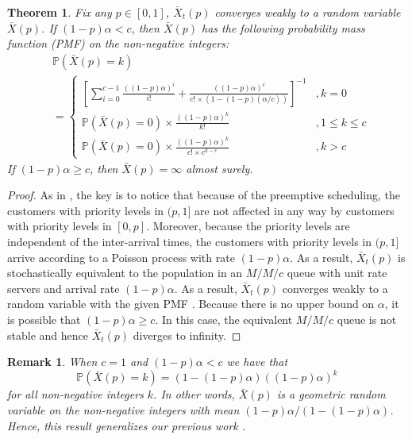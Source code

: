 \documentclass[conference]{IEEEtran}
\newtheorem{theorem}{Theorem}
\newtheorem{remark}{Remark}
\renewcommand{\P}{\mathbb{P}}
\begin{document}
\begin{theorem}
  \label{thrm:X_bar}
  Fix any $p \in [0, 1]$, $\bar X_t(p)$ converges weakly to a random
  variable $\bar X(p)$. If $(1-p)\alpha < c$, then $\bar X(p)$ has the
  following probability mass function (PMF) on the non-negative
  integers:
  \begin{align}
    &\P(\bar X(p) = k)\\
    &= \left\{
      \begin{array}{ll}
        \left[\sum_{i=0}^{c -1} \frac{((1-p)\alpha)^i}{i!} + \frac{((1-p)\alpha)^c}{c! \times (1 - (1-p)(\alpha/c))}\right]^{-1}&, k = 0\\
        \P(\bar X(p) = 0) \times  \frac{((1-p)\alpha)^k}{k!}&, 1 \leq k \leq c\\
        \P(\bar X(p) = 0) \times \frac{((1-p)\alpha)^k}{c! \times c^{k - c}} &, k > c
      \end{array}
    \right.\nonumber
  \end{align}
  If $(1-p)\alpha \geq c$, then $\bar X(p) = \infty$ almost surely.
\end{theorem}
\begin{proof}
  As in \cite{Master_ACC_2017}, the key is to notice that because of
  the preemptive scheduling, the customers with priority levels in
  $(p, 1]$ are not affected in any way by customers with priority
  levels in $[0, p]$. Moreover, because the priority levels are
  independent of the inter-arrival times, the customers with priority
  levels in $(p, 1]$ arrive according to a Poisson process with rate
  $(1-p)\alpha$. As a result, $\bar X_t(p)$ is stochastically equivalent
  to the population in an $M/M/c$ queue with unit rate servers and
  arrival rate $(1-p)\alpha$. As a result, $\bar X_t(p)$ converges
  weakly to a random variable with the given PMF
  \cite[Chapter~3]{Kleinrock}.  Because there is no upper bound on
  $\alpha$, it is possible that $(1-p)\alpha \geq c$. In this case, the
  equivalent $M/M/c$ queue is not stable and hence $\bar X_t(p)$
  diverges to infinity.
\end{proof}

\begin{remark}
  When $c = 1$ and $(1-p)\alpha < c$ we have that
  \begin{equation}
    \P(\bar X(p) = k) = (1 - (1-p)\alpha) ((1-p)\alpha)^k
  \end{equation}
  for all non-negative integers $k$. In other words, $\bar X(p)$ is a
  geometric random variable on the non-negative integers with mean
  $(1-p)\alpha / (1 - (1-p)\alpha)$. Hence, this result generalizes our
  previous work \cite[Theorem~1]{Master_ACC_2017}.
\end{remark}
\end{document}
